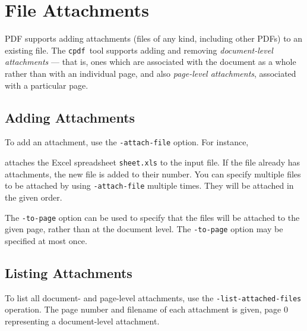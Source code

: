 \documentclass{book}
\newcommand{\cpdf}{\texttt{cpdf}}
\begin{document}
\pagestyle{empty}\thispagestyle{fancy}



\chapter{File Attachments}\pagestyle{fancy}

\noindent{}


  PDF supports adding attachments (files of any kind, including other PDFs) to
an existing file. The \cpdf\ tool supports adding and removing \textit{document-level
attachments} --- that is, ones which are associated with the document as a
whole rather than with an individual page, and also \textit{page-level attachments}, associated with a particular page.
  \section{Adding Attachments}
  To add an attachment, use the \texttt{-attach-file} option. For instance,

\noindent{}
  \noindent attaches the Excel spreadsheet \texttt{sheet.xls} to the input file. If the file already has attachments, the new file is added to their number. You can specify multiple files to be attached by using \verb!-attach-file! multiple times. They will be attached in the given order.
  
  The \texttt{-to-page} option can be used to specify that the files will be attached to the given page, rather than at the document level. The \texttt{-to-page} option may be specified at most once. 


\section{Listing Attachments}
To list all document- and page-level attachments, use the \texttt{-list-attached-files} operation. The page number and filename of each attachment is given, page 0 representing a document-level attachment.
\end{document}

